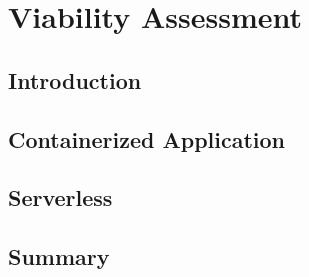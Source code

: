 \chapter{Viability Assessment}


\section{Introduction}


\section{Containerized Application}


\section{Serverless}


\section{Summary}
